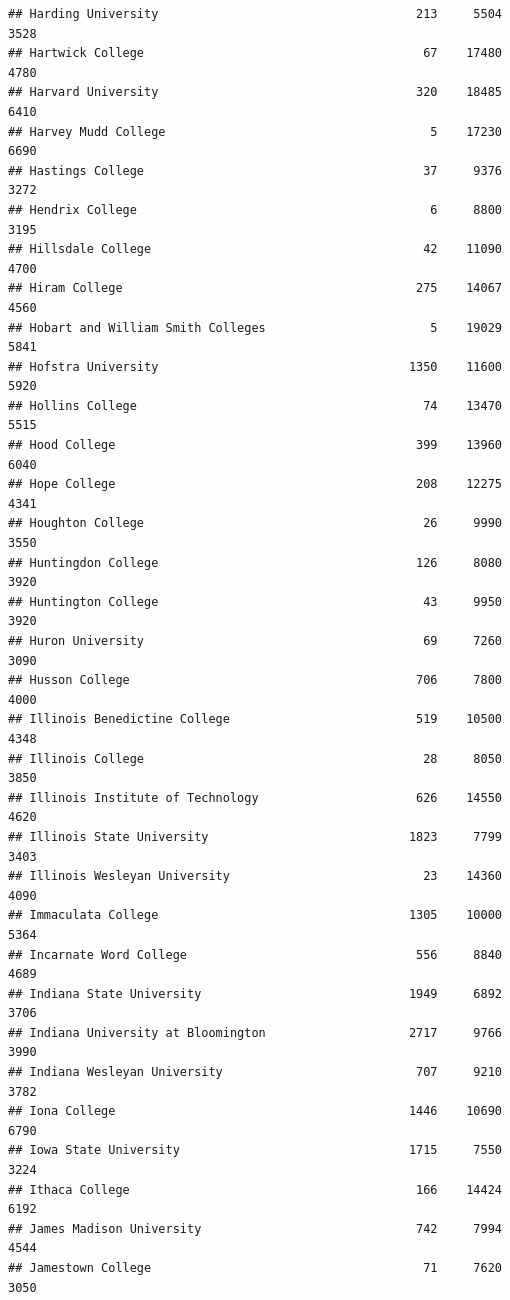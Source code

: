 \documentclass[
]{article}
\begin{document}
\begin{verbatim}
## Harding University                                    213     5504       3528
## Hartwick College                                       67    17480       4780
## Harvard University                                    320    18485       6410
## Harvey Mudd College                                     5    17230       6690
## Hastings College                                       37     9376       3272
## Hendrix College                                         6     8800       3195
## Hillsdale College                                      42    11090       4700
## Hiram College                                         275    14067       4560
## Hobart and William Smith Colleges                       5    19029       5841
## Hofstra University                                   1350    11600       5920
## Hollins College                                        74    13470       5515
## Hood College                                          399    13960       6040
## Hope College                                          208    12275       4341
## Houghton College                                       26     9990       3550
## Huntingdon College                                    126     8080       3920
## Huntington College                                     43     9950       3920
## Huron University                                       69     7260       3090
## Husson College                                        706     7800       4000
## Illinois Benedictine College                          519    10500       4348
## Illinois College                                       28     8050       3850
## Illinois Institute of Technology                      626    14550       4620
## Illinois State University                            1823     7799       3403
## Illinois Wesleyan University                           23    14360       4090
## Immaculata College                                   1305    10000       5364
## Incarnate Word College                                556     8840       4689
## Indiana State University                             1949     6892       3706
## Indiana University at Bloomington                    2717     9766       3990
## Indiana Wesleyan University                           707     9210       3782
## Iona College                                         1446    10690       6790
## Iowa State University                                1715     7550       3224
## Ithaca College                                        166    14424       6192
## James Madison University                              742     7994       4544
## Jamestown College                                      71     7620       3050

\end{verbatim}
\end{document}
